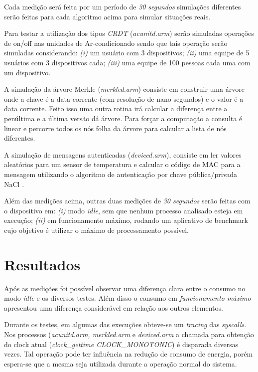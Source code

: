 \documentclass[12pt]{article}
\begin{document}
Cada medição será feita por um período de {\it 30 segundos} simulações diferentes serão feitas para cada algoritmo acima para simular situações reais.

Para testar a utilização dos tipos {\it CRDT} ({\it acunitd.arm}) serão simuladas operações de on/off nas unidades de Ar-condicionado sendo que tais operação serão simuladas considerando: {\it (i)} um usuário com 3 dispositivos; {\it (ii)} uma equipe de 5 usuários com 3 dispositivos cada; {\it (iii)} uma equipe de 100 pessoas cada uma com um dispositivo.

A simulação da árvore Merkle ({\it merkled.arm}) consiste em construir uma árvore onde a chave é a data corrente (com resolução de nano-segundos) e o valor é a data corrente. Feito isso uma outra rotina irá calcular a diferença entre a penúltima e a última versão dá árvore. Para forçar a computação a consulta é linear e percorre todos os nós folha da árvore para calcular a lista de nós diferentes.

A simulação de mensagens autenticadas ({\it deviced.arm}), consiste em ler valores aleatórios para um sensor de temperatura e calcular o código de MAC para a mensagem utilizando o algoritmo de autenticação por chave pública/privada NaCl \cite{nacl}.

Além das medições acima, outras duas medições de {\it 30 segundos} serão feitas com o dispositivo em: {\it (i)} modo {\it idle}, sem que nenhum processo analisado esteja em execução; {\it (ii)} em funcionamento máximo, rodando um aplicativo de benchmark cujo objetivo é utilizar o máximo de processamento possível.

\section{Resultados}

Após as medições foi possível observar uma diferença clara entre o consumo no modo {\it idle } e os diversos testes. Além disso o consumo em {\it funcionamento máximo } apresentou uma diferença considerável em relação aos outros elementos.

Durante os testes, em algumas das execuções obteve-se um {\it tracing } das {\it syscalls}. Nos processos ({\it acunitd.arm, merkled.arm} e {\it deviced.arm} a chamada para obtenção do clock atual ({\it clock\_gettime CLOCK\_MONOTONIC}) é disparada diversas vezes. Tal operação pode ter influência na redução de consumo de energia, porém espera-se que a mesma seja utilizada durante a operação normal do sistema.
\end{document}
